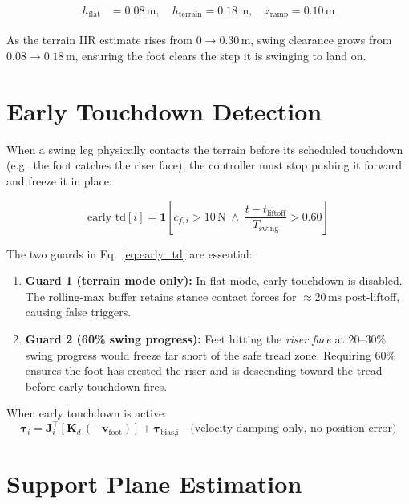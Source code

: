 \documentclass[12pt,a4paper]{report}
\newcommand{\vect}[1]{\bm{#1}}
\newcommand{\mat}[1]{\mathbf{#1}}
\begin{document}
\begin{align*}
    h_\text{flat} &= 0.08\,\text{m},\quad
    h_\text{terrain} = 0.18\,\text{m},\quad
    z_\text{ramp} = 0.10\,\text{m}
\end{align*}

As the terrain IIR estimate rises from $0 \to 0.30\,\text{m}$,
swing clearance grows from $0.08 \to 0.18\,\text{m}$, ensuring
the foot clears the step it is swinging to land on.

\section{Early Touchdown Detection}

When a swing leg physically contacts the terrain before its scheduled
touchdown (e.g.\ the foot catches the riser face), the controller must
stop pushing it forward and freeze it in place:

\begin{equation}
    \text{early\_td}[i] = \mathbf{1}\!\left[
        c_{f,i} > 10\,\text{N}
        \;\wedge\;
        \frac{t - t_\text{liftoff}}{T_\text{swing}} > 0.60
    \right]
    \label{eq:early_td}
\end{equation}

The two guards in Eq.~\eqref{eq:early_td} are essential:

\begin{enumerate}
  \item \textbf{Guard 1 (terrain mode only):} In flat mode, early touchdown
        is disabled.  The rolling-max buffer retains stance contact forces for
        $\approx 20\,\text{ms}$ post-liftoff, causing false triggers.

  \item \textbf{Guard 2 (60\% swing progress):} Feet hitting the \emph{riser
        face} at 20--30\% swing progress would freeze far short of the safe
        tread zone.  Requiring 60\% ensures the foot has crested the riser
        and is descending toward the tread before early touchdown fires.
\end{enumerate}

When early touchdown is active:
\begin{equation}
    \vect{\tau}_i = \mat{J}_i^\top\!\left[\mat{K}_d\,(-\vect{v}_\text{foot})\right]
    + \vect{\tau}_\text{bias,i}
    \quad\text{(velocity damping only, no position error)}
\end{equation}

\section{Support Plane Estimation}
\end{document}

